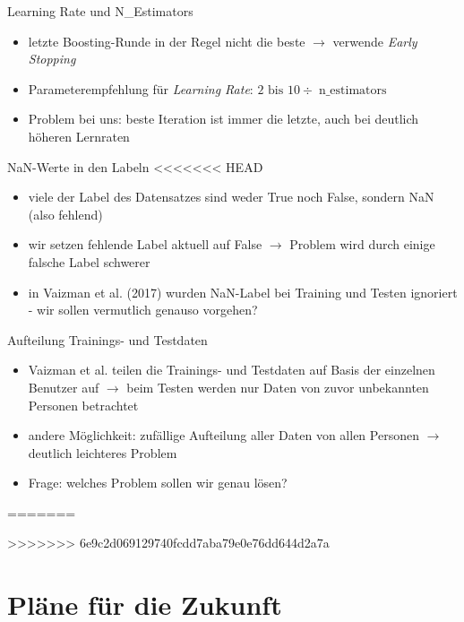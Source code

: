 \documentclass[10pt,%
	wide,%
	xcolor={x11names},%
	hyperref={colorlinks},%
	pantone312,%
	handout,%
	]{beamer}
\begin{document}
\begin{frame}[t]{Learning Rate und N\_Estimators}
	\begin{itemize}
		\item letzte Boosting-Runde in der Regel nicht die beste $\rightarrow$ verwende \emph{Early Stopping}
		\item Parameterempfehlung für \emph{Learning Rate}: $2 \text{ bis } 10 \div \operatorname{n\_estimators}$
		\item Problem bei uns: beste Iteration ist immer die letzte, auch bei deutlich höheren Lernraten
	\end{itemize}
\end{frame}

\begin{frame}[t]{NaN-Werte in den Labeln}
<<<<<<< HEAD
	\begin{itemize}
		\item viele der Label des Datensatzes sind weder True noch False, sondern NaN (also fehlend)
		\item wir setzen fehlende Label aktuell auf False $\rightarrow$ Problem wird durch einige falsche Label schwerer
		\item in Vaizman et al. (2017) wurden NaN-Label bei Training und Testen ignoriert - wir sollen vermutlich genauso vorgehen?
	\end{itemize}
\end{frame}

\begin{frame}[t]{Aufteilung Trainings- und Testdaten}
	\begin{itemize}
		\item Vaizman et al. teilen die Trainings- und Testdaten auf Basis der einzelnen Benutzer auf $\rightarrow$ beim Testen werden nur Daten von zuvor unbekannten Personen betrachtet
		\item andere Möglichkeit: zufällige Aufteilung aller Daten von allen Personen $\rightarrow$ deutlich leichteres Problem
		\item Frage: welches Problem sollen wir genau lösen?
	\end{itemize}
=======
	
\end{frame}

\begin{frame}[t]{}
	
>>>>>>> 6e9c2d069129740fcdd7aba79e0e76dd644d2a7a
\end{frame}

\section{Pläne für die Zukunft}
\end{document}
